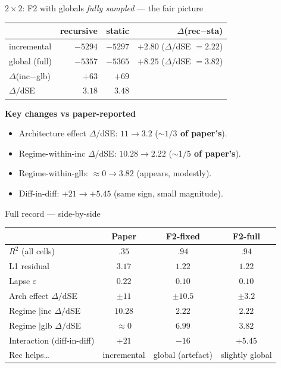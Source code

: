 \documentclass[10pt,aspectratio=169]{beamer}
\newcommand{\main}[1]{\textcolor{CSP-main-dark}{\textbf{#1}}}
\newcommand{\emp}[1]{\textcolor{CSP-emphasis}{\textbf{#1}}}
\newcommand{\accg}[1]{\textcolor{CSP-accent-3-dark}{#1}}      %
\begin{document}
\begin{frame}{$2\!\times\!2$: F2 with globals \emph{fully sampled} --- the fair picture}
\begin{center}
\begin{tabular}{l|rr|r}
\toprule
             & recursive & static & $\Delta$(rec$-$sta) \\
\midrule
incremental  & $-5294$ & $-5297$ & $+2.80$ ($\Delta/$dSE $= 2.22$) \\
global (full)& $-5357$ & $-5365$ & $+8.25$ ($\Delta/$dSE $= 3.82$) \\
\midrule
$\Delta$(inc$-$glb) & $+63$ & $+69$ & \\
$\Delta/$dSE        & \emp{$3.18$} & \emp{$3.48$} & \\
\bottomrule
\end{tabular}
\end{center}

\vspace{0.8em}
\main{Key changes vs paper-reported}
\begin{itemize}\itemsep0.2em
  \item Architecture effect $\Delta/$dSE: $11 \to 3.2$ (\emp{$\sim\!1/3$ of paper's}).
  \item Regime-within-inc $\Delta/$dSE: $10.28 \to 2.22$ (\emp{$\sim\!1/5$ of paper's}).
  \item Regime-within-glb: $\approx 0 \to 3.82$ (\accg{appears, modestly}).
  \item Diff-in-diff: $+21 \to +5.45$ (same sign, small magnitude).
\end{itemize}
\end{frame}

\begin{frame}{Full record --- side-by-side}
\small
\begin{center}
\begin{tabular}{lccc}
\toprule
                             & Paper        & F2-fixed & \main{F2-full} \\
\midrule
$R^2$ (all cells)            & $.35$      & $.94$ & $.94$ \\
L1 residual                  & $3.17$    & $1.22$   & $1.22$ \\
Lapse $\varepsilon$          & $0.22$      & $0.10$ & $0.10$ \\
\midrule
Arch effect $\Delta/$dSE     & $\pm 11$    & $\pm 10.5$ & $\pm 3.2$ \\
Regime $|$inc $\Delta/$dSE   & $10.28$     & $2.22$ & $2.22$ \\
Regime $|$glb $\Delta/$dSE   & $\approx 0$ & $6.99$ & $3.82$ \\
Interaction (diff-in-diff)   & $+21$       & $-16$ & $+5.45$ \\
\midrule
Rec helps\ldots              & incremental & global (artefact) & slightly global \\
\bottomrule
\end{tabular}
\end{center}
\end{frame}
\end{document}
